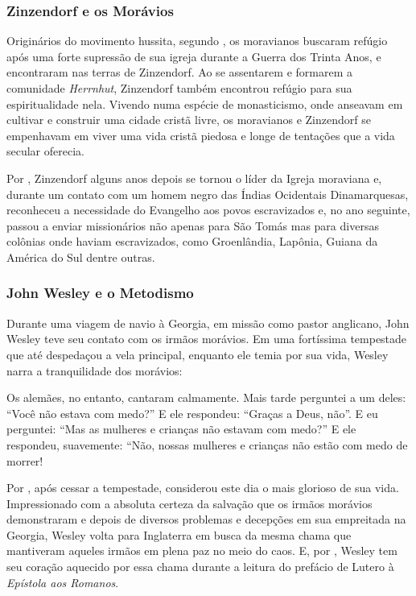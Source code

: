 \documentclass[
    article,            %
	12pt,				%
	oneside,			%
	a4paper,			%
	chapter=TITLE,		%
	section=TITLE,		%
	english,			%
	french,				%
	spanish,			%
	brazil				%
	]{abntex2}
\begin{document}
\subsubsection{Zinzendorf e os Morávios}
Originários do movimento hussita, segundo , os moravianos buscaram refúgio após uma forte supressão de sua igreja durante a Guerra dos Trinta Anos, e encontraram nas terras de Zinzendorf. Ao se assentarem e formarem a comunidade \emph{Herrnhut}, Zinzendorf também encontrou refúgio para sua espiritualidade nela. Vivendo numa espécie de monasticismo, onde anseavam em cultivar e construir uma cidade cristã livre, os moravianos e Zinzendorf se empenhavam em viver uma vida cristã piedosa e longe de tentações que a vida secular oferecia.

Por , Zinzendorf alguns anos depois se tornou o líder da Igreja moraviana e, durante um contato com um homem negro das Índias Ocidentais Dinamarquesas, reconheceu a necessidade do Evangelho aos povos escravizados e, no ano seguinte, passou a enviar missionários não apenas para São Tomás mas para diversas colônias onde haviam escravizados, como Groenlândia, Lapônia, Guiana da América do Sul dentre outras.

\subsubsection{John Wesley e o Metodismo}
Durante uma viagem de navio à Georgia, em missão como pastor anglicano, John Wesley teve seu contato com os irmãos morávios. Em uma fortíssima tempestade que até despedaçou a vela principal, enquanto ele temia por sua vida, Wesley narra a tranquilidade dos morávios:
\begin{citacao}
Os alemães, no entanto, cantaram calmamente. Mais tarde perguntei a um deles: “Você não estava com medo?” E ele respondeu: “Graças a Deus, não”. E eu perguntei: “Mas as mulheres e crianças não estavam com medo?” E ele respondeu, suavemente: “Não, nossas mulheres e crianças não estão com medo de morrer! \cite[p.17]{WESLEY}
\end{citacao}

Por , após cessar a tempestade, considerou este dia o mais glorioso de sua vida. Impressionado com a absoluta certeza da salvação que os irmãos morávios demonstraram e depois de diversos problemas e decepções em sua empreitada na Georgia, Wesley volta para Inglaterra em busca da mesma chama que mantiveram aqueles irmãos em plena paz no meio do caos. E, por , Wesley tem seu coração aquecido por essa chama durante a leitura do prefácio de Lutero à \emph{Epístola aos Romanos}.
\end{document}
